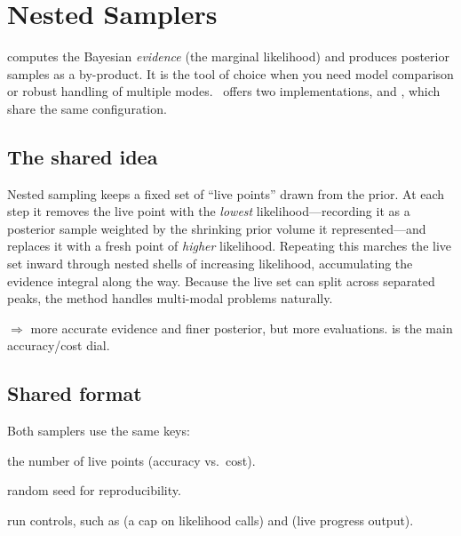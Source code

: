 \chapter{Nested Samplers}
\label{ch:nested}

 computes the Bayesian \emph{evidence} (the marginal likelihood) and
produces posterior samples as a by-product. It is the tool of choice when you need model
comparison or robust handling of multiple modes. \Jarvis\ offers two implementations,
 and , which share the same configuration.

\section{The shared idea}
\label{sec:nested-idea}

Nested sampling\cite{Skilling:2006gxv} keeps a fixed set of  ``live points'' drawn
from the prior. At each step it removes the live point with the \emph{lowest} likelihood---recording
it as a posterior sample weighted by the shrinking prior volume it represented---and replaces it
with a fresh point of \emph{higher} likelihood. Repeating this marches the live set inward through
nested shells of increasing likelihood, accumulating the evidence integral along the way. Because
the live set can split across separated peaks, the method handles multi-modal problems naturally.

\begin{description}[style=nextline, leftmargin=1.2em]
  \item[More live points] $\Rightarrow$ more accurate evidence and finer posterior, but more
        evaluations.  is the main accuracy/cost dial.
\end{description}

\section{Shared format}
\label{sec:nested-format}

Both samplers use the same  keys:

\begin{description}[style=nextline, leftmargin=1.2em]
  \item[\yamlkey{nlive}] the number of live points (accuracy vs.\ cost).
  \item[\yamlkey{rseed}] random seed for reproducibility.
  \item[\yamlkey{run\_nested}] run controls, such as  (a cap on likelihood calls)
        and  (live progress output).
\end{description}

